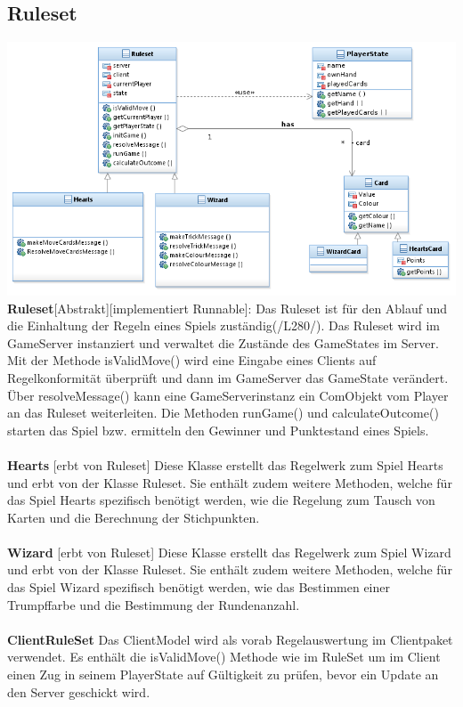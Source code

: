 \documentclass{article}
\begin{document}
\subsection{Ruleset}
\includegraphics[width=\textwidth]{Ruleset}
		\textbf{Ruleset}[Abstrakt][implementiert Runnable]: Das Ruleset  ist für den Ablauf und die Einhaltung der Regeln eines Spiels zuständig(/L280/). Das Ruleset wird im GameServer instanziert und verwaltet die Zustände des GameStates im Server. Mit der Methode isValidMove() wird eine Eingabe eines Clients auf Regelkonformität überprüft und dann im GameServer  das GameState verändert. Über resolveMessage() kann eine GameServerinstanz ein ComObjekt vom Player an das Ruleset weiterleiten. Die Methoden runGame() und calculateOutcome() starten das Spiel bzw. ermitteln den Gewinner und Punktestand eines Spiels. \\ \\
		
		\textbf{Hearts} [erbt von Ruleset]  Diese Klasse erstellt das Regelwerk zum Spiel Hearts und erbt von der Klasse Ruleset. Sie enthält zudem weitere Methoden, welche für das Spiel Hearts spezifisch benötigt werden, wie die Regelung zum Tausch von Karten und die Berechnung der Stichpunkten. \\ \\
		
		\textbf{Wizard} [erbt von Ruleset] Diese Klasse erstellt das Regelwerk zum Spiel Wizard und erbt von der Klasse Ruleset. Sie enthält zudem weitere Methoden, welche für das Spiel Wizard spezifisch benötigt werden, wie das Bestimmen einer Trumpffarbe und die Bestimmung der Rundenanzahl. \\ \\
		
		\textbf{ClientRuleSet}  Das ClientModel wird als vorab Regelauswertung im Clientpaket verwendet. Es enthält die isValidMove() Methode wie im RuleSet um im Client einen Zug in seinem PlayerState auf Gültigkeit zu prüfen, bevor ein Update an den Server geschickt wird. \\ \\
		
\end{document}
